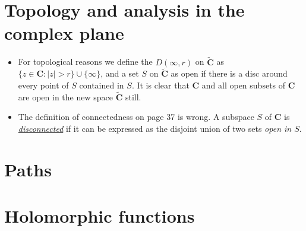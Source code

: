 \documentclass[11pt]{article}
\newcommand{\df}[1]{\ul{\textit{\textsf{#1}}}} %
\newcommand{\C}{\mathbf{C}}
\newcommand{\eC}{\widetilde{\C}}
\newcommand{\abs}[1]{\lvert #1 \rvert}
\begin{document}
\section{Topology and analysis in the complex plane}
\begin{itemize}
    \item For topological reasons we define the $D(\infty, r)$ on $\eC$ as $\{z \in \C : \abs{z} > r\} \cup \{\infty\}$, and a set $S$ on $\eC$ as open if there is a disc around every point of $S$ contained in $S$. It is clear that $\C$ and all open subsets of $\C$ are open in the new space $\eC$ still.
    \item The definition of connectedness on page 37 is wrong. A subspace $S$ of $\C$ is \df{disconnected} if it can be expressed as the disjoint union of two  sets \textit{open in $S$}.
\end{itemize}

\section{Paths}

\section{Holomorphic functions}
\end{document}

